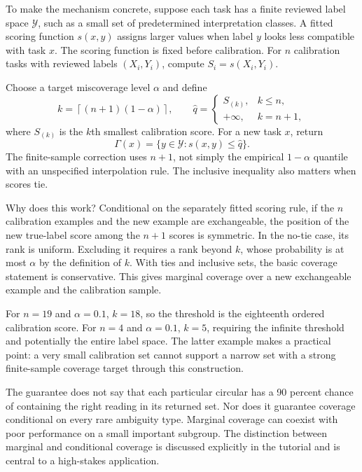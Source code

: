To make the mechanism concrete, suppose each task has a finite reviewed label
space $\mathcal Y$, such as a small set of predetermined interpretation classes.
A fitted scoring function $s(x,y)$ assigns larger values when label $y$ looks less
compatible with task $x$. The scoring function is fixed before calibration.
For $n$ calibration tasks with reviewed labels $(X_i,Y_i)$, compute
$S_i=s(X_i,Y_i)$.

Choose a target miscoverage level $\alpha$ and define
\begin{equation}
 k=\left\lceil(n+1)(1-\alpha)\right\rceil,
 \qquad
 \widehat q=\begin{cases}
 S_{(k)},&k\leq n,\\
 +\infty,&k=n+1,
 \end{cases}
 \label{eq:conformal-quantile}
\end{equation}
where $S_{(k)}$ is the $k$th smallest calibration score. For a new task $x$, return
\begin{equation}
 \Gamma(x)=\{y\in\mathcal Y:s(x,y)\leq\widehat q\}.
 \label{eq:conformal-set}
\end{equation}
The finite-sample correction uses $n+1$, not simply the empirical $1-\alpha$
quantile with an unspecified interpolation rule. The inclusive inequality also
matters when scores tie.

Why does this work? Conditional on the separately fitted scoring rule, if the
$n$ calibration examples and the new example are exchangeable, the position of
the new true-label score among the $n+1$ scores is symmetric. In the no-tie case,
its rank is uniform. Excluding it requires a rank beyond $k$, whose probability
is at most $\alpha$ by the definition of $k$. With ties and inclusive sets, the
basic coverage statement is conservative. This gives marginal coverage over a
new exchangeable example and the calibration sample.

For $n=19$ and $\alpha=0.1$, $k=18$, so the threshold is the eighteenth ordered
calibration score. For $n=4$ and $\alpha=0.1$, $k=5$, requiring the infinite
threshold and potentially the entire label space. The latter example makes a
practical point: a very small calibration set cannot support a narrow set with a
strong finite-sample coverage target through this construction.

The guarantee does not say that each particular circular has a 90 percent chance
of containing the right reading in its returned set. Nor does it guarantee
coverage conditional on every rare ambiguity type. Marginal coverage can coexist
with poor performance on a small important subgroup. The distinction between
marginal and conditional coverage is discussed explicitly in the tutorial
\citep[section 3]{conformal2022} and is central to a high-stakes application.

